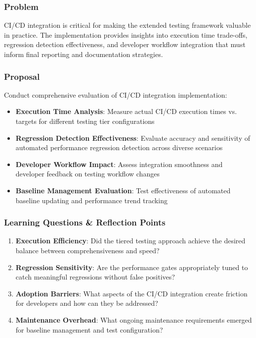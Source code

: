 \documentclass[11pt,a4paper]{article}
\begin{document}
\subsubsection{Problem}
CI/CD integration is critical for making the extended testing framework valuable in practice. The implementation provides insights into execution time trade-offs, regression detection effectiveness, and developer workflow integration that must inform final reporting and documentation strategies.

\subsubsection{Proposal}
Conduct comprehensive evaluation of CI/CD integration implementation:
\begin{itemize}
    \item \textbf{Execution Time Analysis}: Measure actual CI/CD execution times vs. targets for different testing tier configurations
    \item \textbf{Regression Detection Effectiveness}: Evaluate accuracy and sensitivity of automated performance regression detection across diverse scenarios
    \item \textbf{Developer Workflow Impact}: Assess integration smoothness and developer feedback on testing workflow changes
    \item \textbf{Baseline Management Evaluation}: Test effectiveness of automated baseline updating and performance trend tracking
\end{itemize}

\subsubsection{Learning Questions \& Reflection Points}
\begin{enumerate}
    \item \textbf{Execution Efficiency}: Did the tiered testing approach achieve the desired balance between comprehensiveness and speed?
    \item \textbf{Regression Sensitivity}: Are the performance gates appropriately tuned to catch meaningful regressions without false positives?
    \item \textbf{Adoption Barriers}: What aspects of the CI/CD integration create friction for developers and how can they be addressed?
    \item \textbf{Maintenance Overhead}: What ongoing maintenance requirements emerged for baseline management and test configuration?
\end{enumerate}
\end{document}
